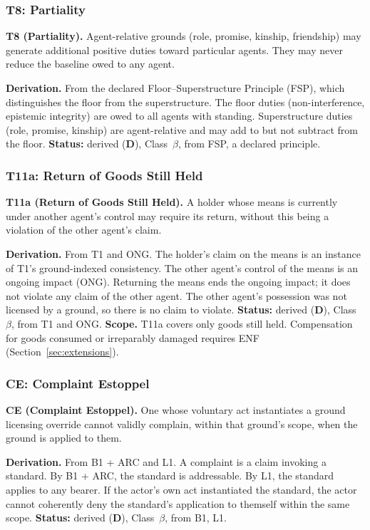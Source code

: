 \documentclass[11pt]{article}
\newcommand{\statusD}{\textcolor{stD}{\textbf{D}}}
\newcommand{\cb}{\texorpdfstring{Class~$\beta$}{Class beta}}
\begin{document}
\subsubsection{T8: Partiality}
\begin{paperbox}
\textbf{T8 (Partiality).} Agent-relative grounds (role, promise, kinship, friendship) may generate additional positive duties toward particular agents. They may never reduce the baseline owed to any agent.
\end{paperbox}
\textbf{Derivation.} From the declared Floor--Superstructure Principle (FSP), which distinguishes the floor from the superstructure. The floor duties (non-interference, epistemic integrity) are owed to all agents with standing. Superstructure duties (role, promise, kinship) are agent-relative and may add to but not subtract from the floor. \textbf{Status:} derived (\statusD{}), \cb{}, from FSP, a declared principle.

\subsubsection{T11a: Return of Goods Still Held}
\begin{paperbox}
\textbf{T11a (Return of Goods Still Held).} A holder whose means is currently under another agent's control may require its return, without this being a violation of the other agent's claim.
\end{paperbox}
\textbf{Derivation.} From T1 and ONG. The holder's claim on the means is an instance of T1's ground-indexed consistency. The other agent's control of the means is an ongoing impact (ONG). Returning the means ends the ongoing impact; it does not violate any claim of the other agent. The other agent's possession was not licensed by a ground, so there is no claim to violate. \textbf{Status:} derived (\statusD{}), \cb{}, from T1 and ONG. \textbf{Scope.} T11a covers only goods still held. Compensation for goods consumed or irreparably damaged requires ENF (Section~\ref{sec:extensions}).

\subsubsection{CE: Complaint Estoppel}
\begin{paperbox}
\textbf{CE (Complaint Estoppel).} One whose voluntary act instantiates a ground licensing override cannot validly complain, within that ground's scope, when the ground is applied to them.
\end{paperbox}
\textbf{Derivation.} From B1 + ARC and L1. A complaint is a claim invoking a standard. By B1 + ARC, the standard is addressable. By L1, the standard applies to any bearer. If the actor's own act instantiated the standard, the actor cannot coherently deny the standard's application to themself within the same scope. \textbf{Status:} derived (\statusD{}), \cb{}, from B1, L1.
\end{document}

